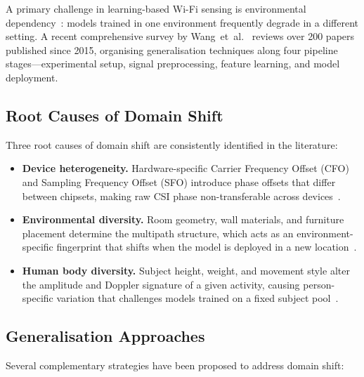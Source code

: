\documentclass[english,bibtex]{kththesis}
\begin{document}
A primary challenge in learning-based Wi-Fi sensing is environmental dependency~\cite{zou2018robust,wang2026survey}: models trained in one environment frequently degrade in a different setting. A recent comprehensive survey by Wang~et~al.~\cite{wang2026survey} reviews over 200 papers published since 2015, organising generalisation techniques along four pipeline stages---experimental setup, signal preprocessing, feature learning, and model deployment.

\subsection{Root Causes of Domain Shift}
\label{sec:crossdomain-causes}

Three root causes of domain shift are consistently identified in the literature:

\begin{itemize}
  \item \textbf{Device heterogeneity.} Hardware-specific Carrier Frequency Offset (CFO) and Sampling Frequency Offset (SFO) introduce phase offsets that differ between chipsets, making raw CSI phase non-transferable across devices~\cite{yousefi2017survey}.
  \item \textbf{Environmental diversity.} Room geometry, wall materials, and furniture placement determine the multipath structure, which acts as an environment-specific fingerprint that shifts when the model is deployed in a new location~\cite{zhang2018crosssense}.
  \item \textbf{Human body diversity.} Subject height, weight, and movement style alter the amplitude and Doppler signature of a given activity, causing person-specific variation that challenges models trained on a fixed subject pool~\cite{zou2018robust}.
\end{itemize}

\subsection{Generalisation Approaches}
\label{sec:crossdomain-methods}

Several complementary strategies have been proposed to address domain shift:
\end{document}
